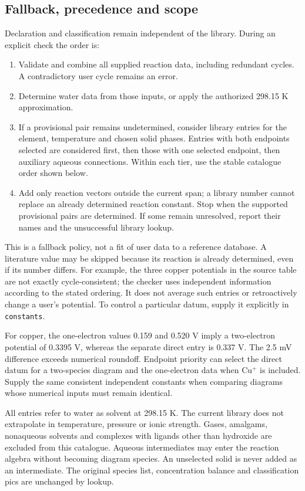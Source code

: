 \documentclass[a4paper,11pt]{ltxdoc}
\begin{document}
\subsection{Fallback, precedence and scope}
Declaration and classification remain independent of the library. During an
explicit check the order is:
\begin{enumerate}
  \item Validate and combine all supplied reaction data, including redundant
    cycles. A contradictory user cycle remains an error.
  \item Determine water data from those inputs, or apply the authorized
    298.15 K approximation.
  \item If a provisional pair remains undetermined, consider library entries
    for the element, temperature and chosen solid phases. Entries with both
    endpoints selected are considered first, then those with one selected
    endpoint, then auxiliary aqueous connections. Within each tier, use the
    stable catalogue order shown below.
  \item Add only reaction vectors outside the current span; a library number
    cannot replace an already determined reaction constant. Stop when the
    supported provisional pairs are determined. If some remain unresolved,
    report their names and the unsuccessful library lookup.
\end{enumerate}

This is a fallback policy, not a fit of user data to a reference database.
A literature value may be skipped because its reaction is already determined,
even if its number differs. For example, the three copper potentials in the
source table are not exactly cycle-consistent; the checker uses independent
information according to the stated ordering. It does not average such entries
or retroactively change a user's potential. To control a particular datum,
supply it explicitly in \texttt{constants}.

For copper, the one-electron values 0.159 and 0.520 V imply a two-electron
potential of 0.3395 V, whereas the separate direct entry is 0.337 V.
The 2.5 mV difference exceeds numerical roundoff. Endpoint priority can select
the direct datum for a two-species diagram and the one-electron data when
Cu$^+$ is included. Supply the same consistent independent constants when
comparing diagrams whose numerical inputs must remain identical.

All entries refer to water as solvent at 298.15 K. The current library does not
extrapolate in temperature, pressure or ionic strength. Gases, amalgams,
nonaqueous solvents and complexes with ligands other than hydroxide are excluded
from this catalogue. Aqueous intermediates may enter the reaction
algebra without becoming diagram species. An unselected solid is never added
as an intermediate. The original species list, concentration balance and
classification pics are unchanged by lookup.
\end{document}
